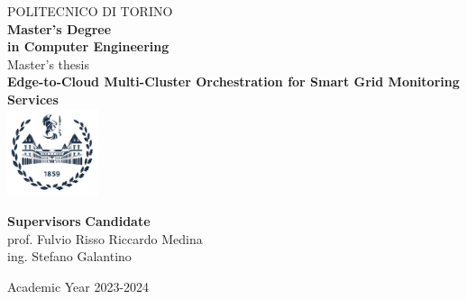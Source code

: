 \begin{titlepage}

\begin{center}

{\huge POLITECNICO DI TORINO}\\[1.5cm]
\textbf{Master’s Degree\\in Computer Engineering}\\[3cm]

{\Large Master's thesis}\\[1cm]
\textbf{\LARGE Edge-to-Cloud Multi-Cluster Orchestration for Smart Grid Monitoring Services  }\\[2cm]
\includegraphics[width=0.2\textwidth]{./Pictures/logo_polito_2021.jpg}
\vspace{4cm}


\begin{minipage}{0.85\textwidth}
\begin{flushleft}\large
\textbf{Supervisors} \hfill \textbf{Candidate}\\
prof. Fulvio Risso \hfill Riccardo Medina\\
ing. Stefano Galantino \\
\end{flushleft}
\end{minipage}

\vfill

Academic Year 2023-2024
\end{center}

\restoregeometry %

\end{titlepage}